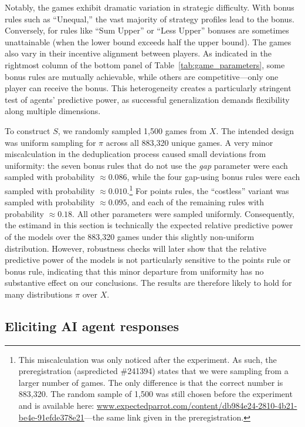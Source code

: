\documentclass[11pt]{article}
\theoremstyle{definition}
\newcommand{\aisub}{AI agent}
\newcommand{\NGamesS}{1,500}
\newcommand{\TotalGames}{883,320}
\begin{document}
Notably, the games exhibit dramatic variation in strategic difficulty. 
With bonus rules such as ``Unequal,'' the vast majority of strategy profiles lead to the bonus.
Conversely, for rules like ``Sum Upper'' or ``Less Upper'' bonuses are sometimes unattainable (when the lower bound exceeds half the upper bound). 
The games also vary in their incentive alignment between players.
As indicated in the rightmost column of the bottom panel of Table~\ref{tab:game_parameters}, some bonus rules are mutually achievable, while others are competitive---only one player can receive the bonus.
This heterogeneity creates a particularly stringent test of agents' predictive power, as successful generalization demands flexibility along multiple dimensions.

To construct $S$, we randomly sampled \NGamesS{} games from $X$. 
The intended design was uniform sampling for $\pi$ across all \TotalGames{} unique games. 
A very minor miscalculation in the deduplication process caused small deviations from uniformity: the seven bonus rules that do not use the \textit{gap} parameter were each sampled with probability $\approx 0.086$, while the four gap-using bonus rules were each sampled with probability $\approx 0.010$.\footnote{This miscalculation was only noticed after the experiment. As such, the preregistration (aspredicted \#241394) states that we were sampling from a larger number of games. 
The only difference is that the correct number is \TotalGames{}. The random sample of \NGamesS{} was still chosen before the experiment and is available here: \url{www.expectedparrot.com/content/db984e24-2810-4b21-be4e-91efde378e21}---the same link given in the preregistration.}
For points rules, the ``costless'' variant was sampled with probability $\approx 0.095$, and each of the remaining rules with probability $\approx 0.18$. 
All other parameters were sampled uniformly. 
Consequently, the estimand in this section is technically the expected relative predictive power of the models over the \TotalGames{} games under this slightly non-uniform distribution.
However, robustness checks will later show that the relative predictive power of the models is not particularly sensitive to the points rule or bonus rule, indicating that this minor departure from uniformity has no substantive effect on our conclusions.
The results are therefore likely to hold for many distributions $\pi$ over $X$.

\subsection{Eliciting \aisub{} responses}
\end{document}
